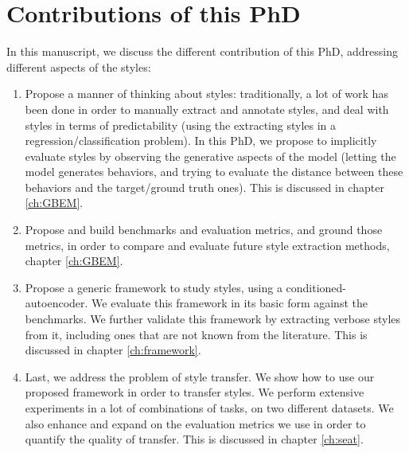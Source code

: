 \section{Contributions of this PhD}
\par In this manuscript, we discuss the different contribution of this PhD, addressing different aspects of the styles:
\begin{enumerate}
  \item Propose a manner of thinking about styles: traditionally, a lot of work has been done in order to manually extract and annotate styles, and deal with styles in terms of predictability (using the extracting styles in a regression/classification problem). In this PhD, we propose to implicitly evaluate styles by observing the generative aspects of the model (letting the model generates behaviors, and trying to evaluate the distance between these behaviors and the target/ground truth ones). This is discussed in chapter \ref{ch:GBEM}.
  \item Propose and build benchmarks and evaluation metrics, and ground those metrics, in order to compare and evaluate future style extraction methods, chapter \ref{ch:GBEM}.
  \item Propose a generic framework to study styles, using a conditioned-autoencoder. We evaluate this framework in its basic form against the benchmarks. We further validate this framework by extracting verbose styles from it, including ones that are not known from the literature. This is discussed in chapter \ref{ch:framework}.
  \item Last, we address the problem of style transfer. We show how to use our proposed framework in order to transfer styles. We perform extensive experiments in a lot of combinations of tasks, on two different datasets. We also enhance and expand on the evaluation metrics we use in order to quantify the quality of transfer. This is discussed in chapter \ref{ch:seat}.
\end{enumerate}

